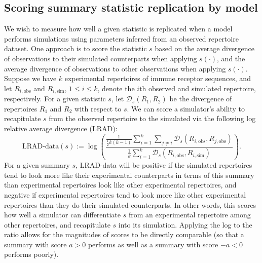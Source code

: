 \documentclass{article}
\begin{document}
\subsection*{Scoring summary statistic replication by model}
We wish to measure how well a given statistic is replicated when a model performs simulations using parameters inferred from an observed repertoire dataset.
One approach is to score the statistic $s$ based on the average divergence of observations to their simulated counterparts when applying $s(\cdot)$, and the average divergence of observations to other observations when applying $s(\cdot)$.
Suppose we have $k$ experimental repertoires of immune receptor sequences, and let $R_{i, \text{obs}}$ and $R_{i, \text{sim}}$, $1 \le i \le k$, denote the $i$th observed and simulated repertoire, respectively.
For a given statistic $s$, let $\mathcal D_s(R_1, R_2)$ be the divergence of repertoires $R_1$ and $R_2$ with respect to $s$.
We can score a simulator's ability to recapitulate $s$ from the observed repertoire to the simulated via the following log relative average divergence (LRAD):
\begin{equation}\label{eq:ScoreObs}
    \text{LRAD-data}(s) :=
    \log \left(
        \frac{
            \frac{1}{\frac{1}{2} k\left(k - 1\right)}
            \sum_{i=1}^{k}
            \sum_{j \ne i}
                \mathcal D_s\left(R_{i, \text{obs}}, R_{j, \text{obs}}\right)
        }
        {
            \frac{1}{k}
            \sum_{i = 1}^k
                \mathcal D_s \left( R_{i, \text{obs}}, R_{i, \text{sim}} \right)
        }
    \right).
\end{equation}
For a given summary $s$, LRAD-data will be positive if the simulated repertoires tend to look more like their experimental counterparts in terms of this summary than experimental repertoires look like other experimental repertoires, and negative if experimental repertoires tend to look more like other experimental repertoires than they do their simulated counterparts.
In other words, this scores how well a simulator can differentiate $s$ from an experimental repertoire among other repertoires, and recapitulate $s$ into its simulation.
Applying the log to the ratio allows for the magnitudes of scores to be directly comparable (so that a summary with score $a > 0$ performs as well as a summary with score $-a < 0$ performs poorly).
\end{document}
